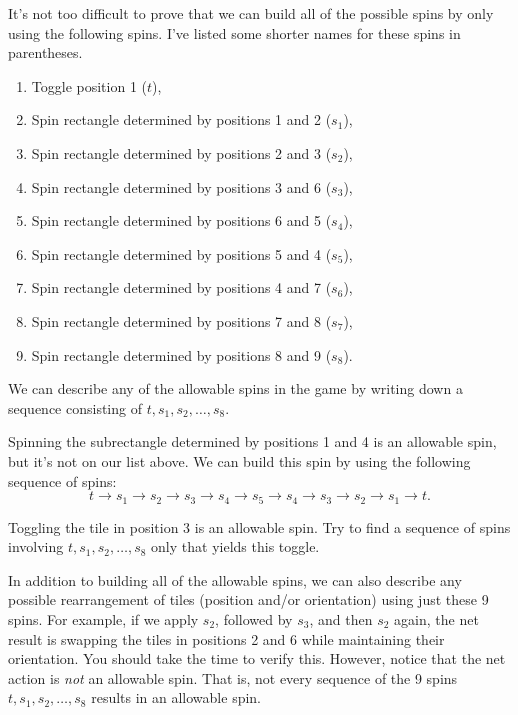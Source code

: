 It's not too difficult to prove that we can build all of the possible spins by only using the following spins.  I've listed some shorter names for these spins in parentheses.
\begin{enumerate}
\item Toggle position 1 ($t$),
\item Spin rectangle determined by positions 1 and 2 ($s_1$),
\item Spin rectangle determined by positions 2 and 3 ($s_2$),
\item Spin rectangle determined by positions 3 and 6 ($s_3$),
\item Spin rectangle determined by positions 6 and 5 ($s_4$),
\item Spin rectangle determined by positions 5 and 4 ($s_5$),
\item Spin rectangle determined by positions 4 and 7 ($s_6$),
\item Spin rectangle determined by positions 7 and 8 ($s_7$),
\item Spin rectangle determined by positions 8 and 9 ($s_8$).
\end{enumerate}
We can describe any of the allowable spins in the game by writing down a sequence consisting of $t,s_1, s_2,\ldots, s_8$.

\begin{example}
Spinning the subrectangle determined by positions 1 and 4 is an allowable spin, but it's not on our list above. We can build this spin by using the following sequence of spins: 
\[
t\to s_1\to s_2\to s_3\to s_4\to s_5\to s_4\to s_3\to s_2\to s_1\to t.
\]
\end{example}

\begin{exercise}
Toggling the tile in position 3 is an allowable spin. Try to find a sequence of spins involving $t, s_1, s_2, \ldots, s_8$ only that yields this toggle.
\end{exercise}

In addition to building all of the allowable spins, we can also describe any possible rearrangement of tiles (position and/or orientation) using just these 9 spins.  For example, if we apply $s_2$, followed by $s_3$, and then $s_2$ again, the net result is swapping the tiles in positions 2 and 6 while maintaining their orientation.  You should take the time to verify this. However, notice that the net action is \emph{not} an allowable spin.  That is, not every sequence of the 9 spins $t, s_1, s_2,\ldots, s_8$ results in an allowable spin.  

